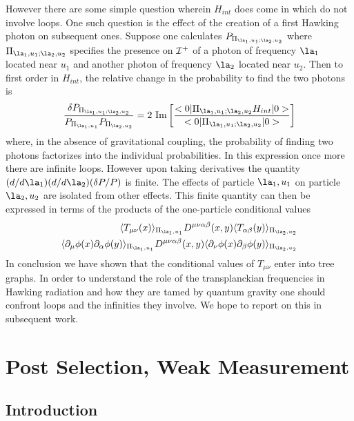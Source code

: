 However there are some simple question wherein $H_{int}$ does come in which do
not involve loops. One such question is the effect of the creation of a first
Hawking photon on subsequent ones. Suppose one calculates
$P_{\Pi_{\la_1,u_1;\la_2,u_2}}$ where $\Pi_{\la_1,u_1;\la_2,u_2}$ specifies the
presence on ${\cal I}^+$ of a photon of frequency $\la_1$ located near $u_1$
and another photon of frequency $\la_2$ located near $u_2$. Then to first order
in $H_{int}$, the relative change in the probability to find the two photons is
\begin{equation}
{ \delta P_{\Pi_{\la_1,u_1;\la_2,u_2}} \over
P_{\Pi_{\la_1,u_1}}P_{\Pi_{\la_2,u_2}} }
=
2 \mbox{ Im}\left[
{\bra {0}\Pi_{\la_1,u_1;\la_2,u_2} H_{int} \ket{0} \over
\bra {0}\Pi_{\la_1,u_1;\la_2,u_2}  \ket{0}}
\right]
\end{equation}
where, in the absence of gravitational coupling, the probability of
finding two photons factorizes into the individual
probabilities.
In this expression once more there are infinite loops. However upon taking
derivatives the quantity
$(d/d\la_1)(d/ d\la_2) (\delta P / P)$ is finite. The  effects
of particle $\la_1,u_1$ on particle $\la_2,u_2$ are
isolated from other
effects. This finite quantity can then
be expressed in terms of the
products of the one-particle conditional values
\begin{eqnarray}
\langle T_{\mu\nu}(x)\rangle_{\Pi_{\la_1,u_1}} D^{\mu \nu \alpha \beta}(x,y)
\langle T_{\alpha\beta}(y)\rangle_{\Pi_{\la_2,u_2}}\nonumber\\
\langle \partial_\mu \phi(x)\partial_\alpha
\phi(y)\rangle_{\Pi_{\la_1,u_1}} D^{\mu \nu \alpha \beta}(x,y)
\langle \partial_\nu \phi(x)\partial_\beta \phi(y)\rangle_{\Pi_{\la_2,u_2}}
\end{eqnarray}
In conclusion we have shown that the conditional values of $T_{\mu\nu}$ enter
into tree graphs. In order to understand the role of the transplanckian
frequencies in Hawking radiation and how they are tamed by quantum gravity one
should confront loops and the infinities they involve. We hope to report on
this in subsequent work.


\section {Post Selection, Weak Measurement}

\subsection{Introduction}

